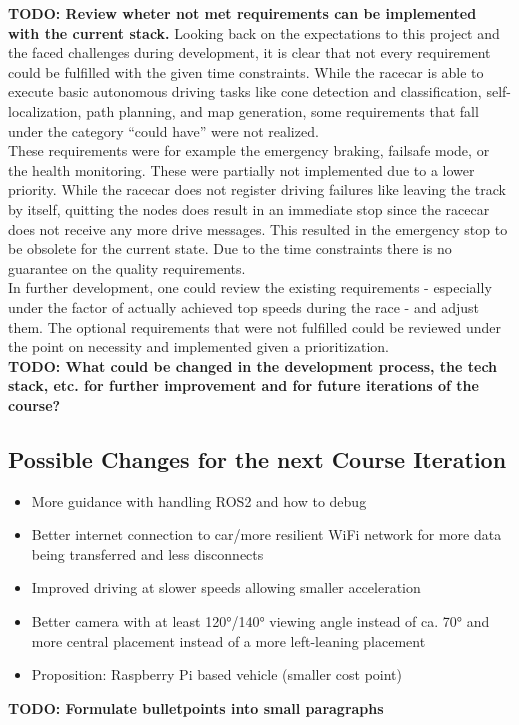 \textbf{TODO: Review wheter not met requirements can be implemented with the current stack.}
Looking back on the expectations to this project and the faced challenges during development, it is clear that not every requirement could be fulfilled with the given time constraints. While the racecar is able to execute basic autonomous driving tasks like cone detection and classification, self-localization, path planning, and map generation, some requirements that fall under the category ``could have'' were not realized.\\
\newline
These requirements were for example the emergency braking, failsafe mode, or the health monitoring. These were partially not implemented due to a lower priority. While the racecar does not register driving failures like leaving the track by itself, quitting the nodes does result in an immediate stop since the racecar does not receive any more drive messages. This resulted in the emergency stop to be obsolete for the current state. Due to the time constraints there is no guarantee on the quality requirements. \\
\newline
In further development, one could review the existing requirements - especially under the factor of actually achieved top speeds during the race - and adjust them. The optional requirements that were not fulfilled could be reviewed under the point on necessity and implemented given a prioritization. \\
\newline
\textbf{TODO: What could be changed in the development process, the tech stack, etc. for further improvement and for future iterations of the course?}
\subsection{Possible Changes for the next Course Iteration}
\begin{itemize}
	\item More guidance with handling ROS2 and how to debug
	\item Better internet connection to car/more resilient WiFi network for more data being transferred and less disconnects
	\item Improved driving at slower speeds allowing smaller acceleration
	\item Better camera with at least 120°/140° viewing angle instead of ca. 70° and more central placement instead of a more left-leaning placement
	\item Proposition: Raspberry Pi based vehicle (smaller cost point)
\end{itemize}
\textbf{TODO: Formulate bulletpoints into small paragraphs}